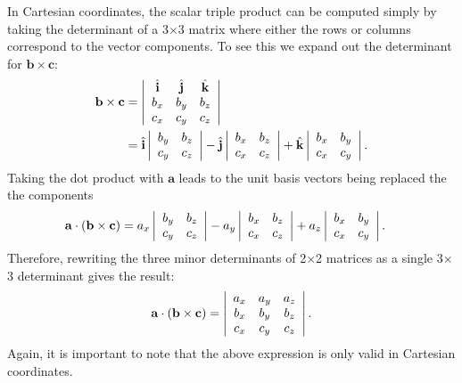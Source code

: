 In Cartesian coordinates, the scalar triple product can be computed simply by taking the determinant of a 3$\times$3 matrix where either the rows or columns correspond to the vector components. To see this we expand out the determinant for $\mathbf{b} \times \mathbf{c}$:
\begin{align}
  \mathbf{b} \times \mathbf{c} &= \left| \begin{array}{c c c} \hat{\mathbf{i}} & \hat{\mathbf{j}} & \hat{\mathbf{k}} \\ b_x & b_y & b_z \\ c_x & c_y & c_z \end{array} \right| \nonumber \\
 &= \hat{\mathbf{i}} \left| \begin{array}{c c} b_y & b_z \\ c_y & c_z \end{array} \right| 
  - \hat{\mathbf{j}} \left| \begin{array}{c c} b_x & b_z \\ c_x & c_z \end{array} \right|
  + \hat{\mathbf{k}} \left| \begin{array}{c c} b_x & b_y \\ c_x & c_y \end{array} \right| . \nonumber
\end{align}
Taking the dot product with $\mathbf{a}$ leads to the unit basis vectors being replaced the the components
\begin{align}
  \mathbf{a} \cdot ( \mathbf{b} \times \mathbf{c} ) &=
    a_x \left| \begin{array}{c c} b_y & b_z \\ c_y & c_z \end{array} \right| 
  - a_y \left| \begin{array}{c c} b_x & b_z \\ c_x & c_z \end{array} \right|
  + a_z \left| \begin{array}{c c} b_x & b_y \\ c_x & c_y \end{array} \right| . \nonumber
\end{align}
Therefore, rewriting the three minor determinants of 2$\times$2 matrices as a single 3$\times$3 determinant gives the result: 
\begin{align}
  \mathbf{a} \cdot ( \mathbf{b} \times \mathbf{c} ) = 
  \left| \begin{array}{c c c} a_x & a_y & a_z \\ b_x & b_y & b_z \\ c_x & c_y & c_z \end{array} \right| .
\end{align}
Again, it is important to note that the above expression is only valid in Cartesian coordinates.

